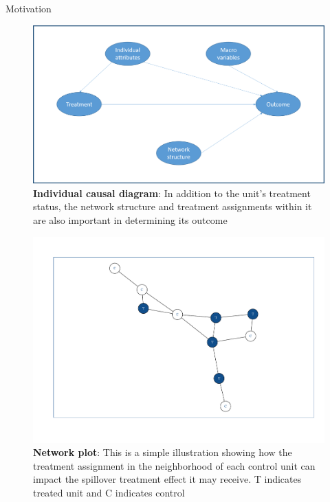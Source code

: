 \documentclass[final]{beamer}
\newlength{\onecolwid}
\newlength{\onecolwidd}
\begin{document}
\begin{frame}[t]
\begin{columns}[t]
\begin{column}{\onecolwidd}
\begin{block}{Motivation}
	
\centering
\begin{figure}
\centering
\includegraphics[scale=0.8]{Individual_structure.png}
\vspace*{10mm}
\caption{\small \textbf{Individual causal diagram}: In addition to the unit's treatment status, the network structure and treatment assignments within it are also important in determining its outcome}
\end{figure}
	
\centering
\begin{figure}
\centering
\includegraphics[scale=0.9]{Dummy_network.pdf}
\vspace*{-15mm}
\caption{\small \textbf{Network plot}: This is a simple illustration showing how the treatment assignment in the neighborhood of each control unit can impact the spillover treatment effect it may receive. T indicates treated unit and C indicates control}
\end{figure}	
	
	
	

\end{block}
\end{column}
\end{columns}
\end{frame}
\end{document}
